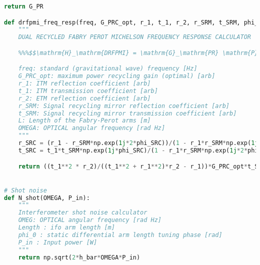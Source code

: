 \begin{lstlisting}[frame=single, language=Python]
    return G_PR

def drfpmi_freq_resp(freq, G_PRC_opt, r_1, t_1, r_2, r_SRM, t_SRM, phi_SRC, L, phi_0, P_in, OMEGA):
    """
    DUAL RECYCLED FABRY PEROT MICHELSON FREQUENCY RESPONSE CALCULATOR

    %%%$$\mathrm{H}_\mathrm{DRFPMI} = \mathrm{G}_\mathrm{PR} \mathrm{P}_\mathrm{in} L \Omega \bigg[ \frac{ t_1^2 r_2}{(t_1^2 + r_1^2)r_2 - r_1} \frac{t_\mathrm{SRM} t_1 e^{-i\phi_\mathrm{SRC}}}{1-r_1 r_\mathrm{SRM} e^{-i2\phi_\mathrm{SRC}}} \frac{e^{-i 2 \pi L f / c} \mathrm{sin}( 2 \pi f / c)}{ 2 \pi L f } \frac{\mathrm{sin}(\phi_0)}{1- [(r_1 - r_\mathrm{SRM} e^{-i2\phi_\mathrm{SRC}})/(1-r_1 r_\mathrm{SRM}e^{-i2\phi_\mathrm{SRC}})] r_2 e^{-i 4 \pi L f / c}} \bigg]$$%%%

    freq: standard (gravitational wave) frequency [Hz]
    G_PRC_opt: maximum power recycling gain (optimal) [arb]
    r_1: ITM reflection coefficient [arb]
    t_1: ITM transmission coefficient [arb]
    r_2: ETM reflection coefficient [arb]
    r_SRM: Signal recycling mirror reflection coefficient [arb]
    t_SRM: Signal recycling mirror transmission coefficient [arb]
    L: Length of the Fabry-Perot arms [m]
    OMEGA: OPTICAL angular frequency [rad Hz]
    """
    r_SRC = (r_1 - r_SRM*np.exp(1j*2*phi_SRC))/(1 - r_1*r_SRM*np.exp(1j*2*phi_SRC))
    t_SRC = t_1*t_SRM*np.exp(1j*phi_SRC)/(1 - r_1*r_SRM*np.exp(1j*2*phi_SRC))

    return ((t_1**2 * r_2)/((t_1**2 + r_1**2)*r_2 - r_1))*G_PRC_opt*t_SRC*(P_in*L*OMEGA*np.exp((-1j*L*2.0*np.pi*freq)/cee)*np.sin((L*2.0*np.pi*freq)/cee)/(L*2.0*np.pi*freq))/(1-r_SRC*r_2*np.exp(-1j*L*4.0*np.pi*freq/cee))


# Shot noise
def N_shot(OMEGA, P_in):
    """
    Interferometer shot noise calculator
    OMEG: OPTICAL angular frequency [rad Hz]
    Length : ifo arm length [m]
    phi_0 : static differential arm length tuning phase [rad]
    P_in : Input power [W]
    """
    return np.sqrt(2*h_bar*OMEGA*P_in)
\end{lstlisting}
